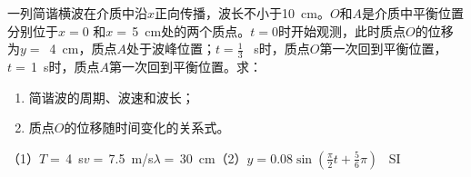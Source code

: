 一列简谐横波在介质中沿\(x\)正向传播，波长不小于\qty{10}{cm}。\(O\)和\(A\)是介质中平衡位置分别位于\(x = 0\) 和\(x =\)\,\qty{5}{cm}处的两个质点。\(t = 0\)时开始观测，此时质点\(O\)的位移为\(y =\) \,\qty{4}{cm}，质点\(A\)处于波峰位置；\(t = \frac{1}{3}\) \qty{}{s}时，质点\(O\)第一次回到平衡位置，\(t =\)\,\qty{1}{s}时，质点\(A\)第一次回到平衡位置。求：
\begin{enumerate}
	\item 简谐波的周期、波速和波长；
	\item 质点\(O\)的位移随时间变化的关系式。
\end{enumerate}
\begin{answer}
   （1）\(T =\)\,\qty{4}{s}\quad \(v =\)\,\qty{7.5}{m/s}\quad \(\lambda =\)\,\qty{30}{cm}（2）\(y = 0.08\sin(\frac{\pi}{2}t + \frac{5}{6}\pi)\) \qty{}{SI}
\end{answer}